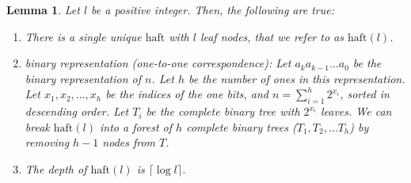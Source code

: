 \documentclass[11pt, letter]{article}
\newtheorem{lemma}{Lemma}
\newcommand{\haft}{\mathrm{haft}}
\begin{document}
\begin{lemma}
\label{lemma: hftproperties}
Let $l$ be a positive integer. Then, the following are true:
\begin{enumerate}
\item \label{lmitem: hftprop-unique} There is a single unique $\haft$ with $l$ leaf nodes, that we refer to as $\haft(l)$.
\item \label{lmitem: hftprop-bin} binary representation (one-to-one correspondence): 
 Let $a_{k}a_{k-1}...a_{0}$ be the binary representation of $n$. Let $h$ be the
number of ones  in this representation. Let $x_{1}, x_{2}, \ldots, x_{h}$ be the indices of the one bits, and $n =
\sum_{i=1}^{h} 2^{x_{i}}$, sorted in descending order. Let $T_{i}$ be the complete
binary tree with $2^{x_{i}}$ leaves. We can break $\haft(l)$ into a forest of $h$ complete binary trees ($T_{1}, T_{2},
\ldots T_{h}$) by removing $h-1$ nodes from $T$. 
\item \label{lmitem: hftprop-depth} The depth of $\haft(l)$ is $\lceil \log l \rceil$.
\end{enumerate}
\end{lemma}
\end{document}
